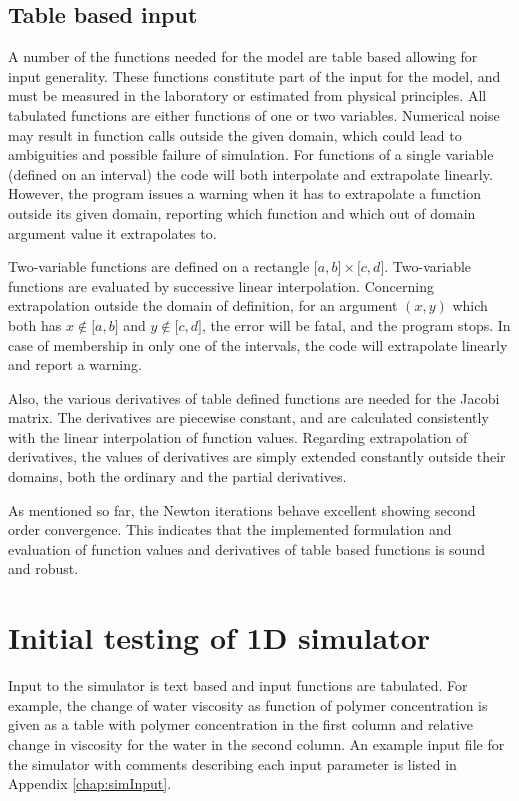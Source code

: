 \subsection{Table based input}
A number of the functions needed for the model are table based allowing for input generality. These functions constitute part of the input for the model, and must be measured in the laboratory or estimated from physical principles. All tabulated functions are either functions of one or two variables. Numerical noise may result in function calls outside the given domain, which could lead to ambiguities and possible failure of simulation. For functions of a single variable (defined on an interval) the code will both interpolate and extrapolate linearly. However, the program issues a warning when it has to extrapolate a function outside its given domain, reporting which function and which out of domain argument value it extrapolates to.

Two-variable functions are defined on a rectangle $\big[a,b\big]\times\big[c,d\big]$. Two-variable functions are evaluated by successive linear interpolation. Concerning extrapolation outside the domain of definition, for an argument $(x,y)$ which both has $x\notin\big[a,b\big]$ and $y\notin\big[c,d\big]$, the error will be fatal, and the program stops. In case of membership in only one of the intervals, the code will extrapolate linearly and report a warning.

Also, the various derivatives of table defined functions are needed for the Jacobi matrix. The derivatives are piecewise constant, and are calculated consistently with the linear interpolation of function values. Regarding extrapolation of derivatives, the values of derivatives are simply extended constantly outside their domains, both the ordinary and the partial derivatives.

As mentioned so far, the Newton iterations behave excellent showing second order convergence. This indicates that the implemented formulation and evaluation of function values and derivatives of table based functions is sound and robust.   


\section{Initial testing of 1D simulator}

Input to the simulator is text based and input functions are tabulated. For example, the change of water viscosity as function of polymer concentration is given as a table with polymer concentration in the first column and relative change in viscosity for the water in the second column. An example input file for the simulator with comments describing each input parameter is listed in Appendix \ref{chap:simInput}. 

